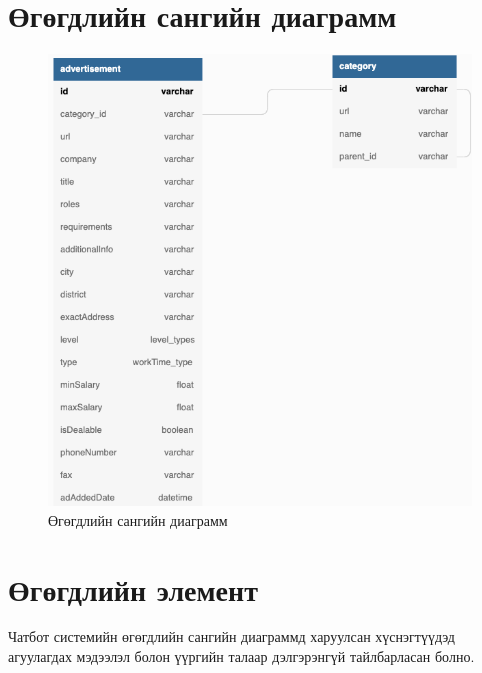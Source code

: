 \section{Өгөгдлийн сангийн диаграмм}
\begin{figure}[ht]
  \centering
  \includegraphics[width = \textwidth-2cm]{images/dbDiagram.png}
  \caption{Өгөгдлийн сангийн диаграмм}\label{fig:dbDiagram}
\end{figure}
\newpage

\section{Өгөгдлийн элемент}
Чатбот системийн өгөгдлийн сангийн диаграммд харуулсан хүснэгтүүдэд агуулагдах мэдээлэл болон үүргийн талаар дэлгэрэнгүй тайлбарласан болно. 
